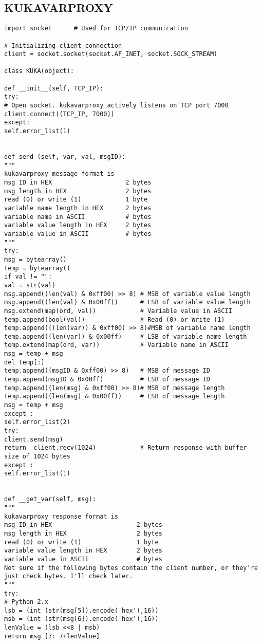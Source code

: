 \subsection{KUKAVARPROXY}
\begin{lstlisting}[language=terCmd]
import socket      # Used for TCP/IP communication

# Initializing client connection
client = socket.socket(socket.AF_INET, socket.SOCK_STREAM) 

class KUKA(object):

def __init__(self, TCP_IP):
try: 
# Open socket. kukavarproxy actively listens on TCP port 7000
client.connect((TCP_IP, 7000))
except: 
self.error_list(1)


def send (self, var, val, msgID):
"""
kukavarproxy message format is 
msg ID in HEX                    2 bytes
msg length in HEX                2 bytes
read (0) or write (1)            1 byte
variable name length in HEX      2 bytes
variable name in ASCII           # bytes
variable value length in HEX     2 bytes
variable value in ASCII          # bytes
"""
try:
msg = bytearray()
temp = bytearray()
if val != "":
val = str(val)
msg.append((len(val) & 0xff00) >> 8) # MSB of variable value length
msg.append((len(val) & 0x00ff))      # LSB of variable value length
msg.extend(map(ord, val))            # Variable value in ASCII
temp.append(bool(val))               # Read (0) or Write (1)
temp.append(((len(var)) & 0xff00) >> 8)#MSB of variable name length
temp.append((len(var)) & 0x00ff)     # LSB of variable name length
temp.extend(map(ord, var))           # Variable name in ASCII 
msg = temp + msg
del temp[:]
temp.append((msgID & 0xff00) >> 8)   # MSB of message ID
temp.append(msgID & 0x00ff)          # LSB of message ID
temp.append((len(msg) & 0xff00) >> 8)# MSB of message length
temp.append((len(msg) & 0x00ff))     # LSB of message length
msg = temp + msg
except :
self.error_list(2)
try:
client.send(msg)
return  client.recv(1024)            # Return response with buffer size of 1024 bytes
except :
self.error_list(1)


def __get_var(self, msg):
"""
kukavarproxy response format is 
msg ID in HEX                       2 bytes
msg length in HEX                   2 bytes
read (0) or write (1)               1 byte
variable value length in HEX        2 bytes
variable value in ASCII             # bytes
Not sure if the following bytes contain the client number, or they're just check bytes. I'll check later.
"""
try:
# Python 2.x
lsb = (int (str(msg[5]).encode('hex'),16))
msb = (int (str(msg[6]).encode('hex'),16))
lenValue = (lsb <<8 | msb)
return msg [7: 7+lenValue]


\end{lstlisting}

